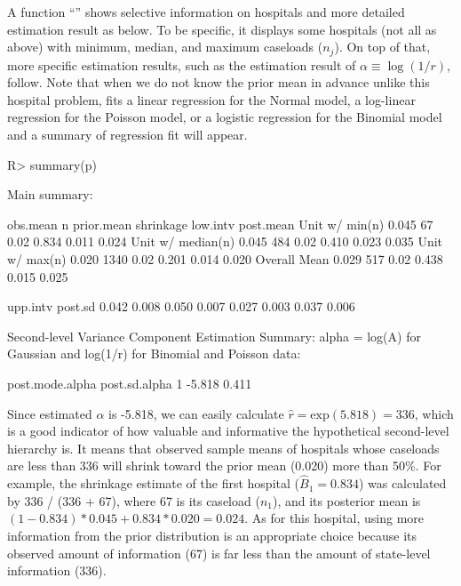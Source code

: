 \documentclass[article]{jss}
\begin{document}
A function ``'' shows selective information on hospitals and more detailed estimation result as below. To be specific, it displays some hospitals (not all as above) with minimum, median, and maximum caseloads ($n_{j}$). On top of that, more specific estimation results, such as the estimation result of $\alpha\equiv\log(1/r)$, follow. Note that when we do not know the prior mean in advance unlike this hospital problem,  fits a linear regression for the Normal model, a log-linear regression for the Poisson model, or a logistic regression for the Binomial model and a summary of regression fit will appear.
\begin{CodeChunk}
\begin{CodeInput}
R> summary(p)
\end{CodeInput}
\begin{CodeOutput}
Main summary:

                  obs.mean    n prior.mean shrinkage low.intv post.mean
Unit w/ min(n)       0.045   67       0.02     0.834    0.011     0.024
Unit w/ median(n)    0.045  484       0.02     0.410    0.023     0.035
Unit w/ max(n)       0.020 1340       0.02     0.201    0.014     0.020
Overall Mean         0.029  517       0.02     0.438    0.015     0.025

                  upp.intv post.sd
                     0.042   0.008
                     0.050   0.007
                     0.027   0.003
                     0.037   0.006

Second-level Variance Component Estimation Summary:
alpha = log(A) for Gaussian and log(1/r) for Binomial and Poisson data:

  post.mode.alpha post.sd.alpha
1          -5.818         0.411
\end{CodeOutput}
\end{CodeChunk}
Since estimated $\alpha$ is -5.818, we can easily calculate $\hat{r}=\textrm{exp}(5.818)=336$, which is a good indicator of how valuable and informative the hypothetical second-level hierarchy is. It means that observed sample means of hospitals whose caseloads are less than 336 will shrink toward the prior mean (0.020) more than 50\%. For example, the shrinkage estimate of the first hospital ($\hat{B}_{1}= 0.834$) was calculated by 336 / (336 + 67), where 67 is its caseload ($n_{1}$), and its posterior mean is $(1-0.834)*0.045 + 0.834 * 0.020=0.024$. As for this hospital, using more information from the prior distribution is an appropriate choice because its observed amount of information (67) is far less than the amount of state-level information (336).
\end{document}
